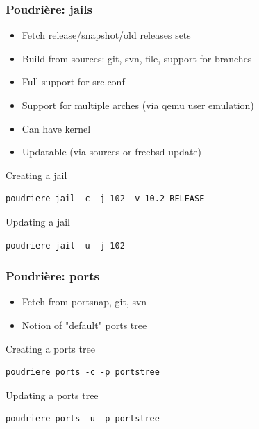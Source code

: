 \begin{frame}[fragile]
	\frametitle{Poudrière: jails}
	\begin{itemize}
			\pause
		\item Fetch release/snapshot/old releases sets
			\pause
		\item Build from sources: git, svn, file, support for branches
			\pause
		\item Full support for src.conf
			\pause
		\item Support for multiple arches (via qemu user emulation)
			\pause
		\item Can have kernel
			\pause
		\item Updatable (via sources or freebsd-update)
	\end{itemize}
	\pause
	Creating a jail
	\begin{lstlisting}
poudriere jail -c -j 102 -v 10.2-RELEASE
\end{lstlisting}
	\pause
	Updating a jail
	\begin{lstlisting}
poudriere jail -u -j 102
\end{lstlisting}
\end{frame}

\begin{frame}[fragile]
	\frametitle{Poudrière: ports}
	\begin{itemize}
			\pause
		\item Fetch from portsnap, git, svn
			\pause
		\item Notion of "default" ports tree
	\end{itemize}
	\pause
	Creating a ports tree
	\begin{lstlisting}
poudriere ports -c -p portstree
\end{lstlisting}
	\pause
	Updating a ports tree
	\begin{lstlisting}
poudriere ports -u -p portstree
\end{lstlisting}
\end{frame}

